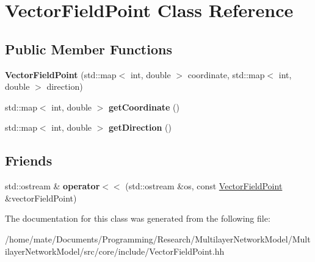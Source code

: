 \hypertarget{classVectorFieldPoint}{}\section{Vector\+Field\+Point Class Reference}
\label{classVectorFieldPoint}
\subsection*{Public Member Functions}
\begin{DoxyCompactItemize}
\item 
{\bfseries Vector\+Field\+Point} (std\+::map$<$ int, double $>$ coordinate, std\+::map$<$ int, double $>$ direction)\hypertarget{classVectorFieldPoint_aaf7f444221b412f58e3066fb359f6ced}{}\label{classVectorFieldPoint_aaf7f444221b412f58e3066fb359f6ced}

\item 
std\+::map$<$ int, double $>$ {\bfseries get\+Coordinate} ()\hypertarget{classVectorFieldPoint_aaac572daff42e5aa46d92ffc2f681095}{}\label{classVectorFieldPoint_aaac572daff42e5aa46d92ffc2f681095}

\item 
std\+::map$<$ int, double $>$ {\bfseries get\+Direction} ()\hypertarget{classVectorFieldPoint_a185b994999d47371fad7e8156e211f28}{}\label{classVectorFieldPoint_a185b994999d47371fad7e8156e211f28}

\end{DoxyCompactItemize}
\subsection*{Friends}
\begin{DoxyCompactItemize}
\item 
std\+::ostream \& {\bfseries operator$<$$<$} (std\+::ostream \&os, const \hyperlink{classVectorFieldPoint}{Vector\+Field\+Point} \&vector\+Field\+Point)\hypertarget{classVectorFieldPoint_a0acdca72efec81baafb8b278ed2a545f}{}\label{classVectorFieldPoint_a0acdca72efec81baafb8b278ed2a545f}

\end{DoxyCompactItemize}


The documentation for this class was generated from the following file\+:\begin{DoxyCompactItemize}
\item 
/home/mate/\+Documents/\+Programming/\+Research/\+Multilayer\+Network\+Model/\+Multilayer\+Network\+Model/src/core/include/Vector\+Field\+Point.\+hh\end{DoxyCompactItemize}
